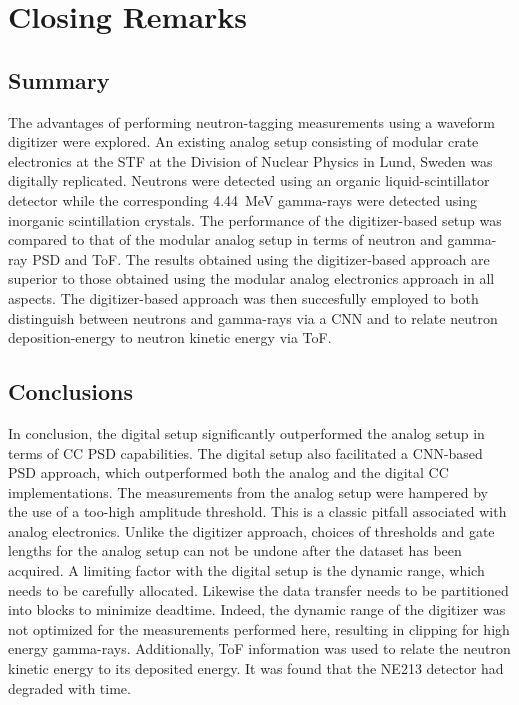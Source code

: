 \documentclass[main.tex]{subfiles}
\begin{document}
\chapter{Closing Remarks}
\section{Summary}
The advantages of performing neutron-tagging measurements using a waveform digitizer were explored. An existing analog setup consisting of modular crate electronics at the STF at the Division of Nuclear Physics  in Lund, Sweden was digitally replicated. Neutrons were detected using an organic liquid-scintillator detector while the corresponding \SI{4.44}{MeV} gamma-rays were detected using inorganic scintillation crystals. The performance of the digitizer-based setup was compared to that of the modular analog setup in terms of neutron and gamma-ray PSD and ToF. The results obtained using the digitizer-based approach are superior to those obtained using the modular analog electronics approach in all aspects. The digitizer-based approach was then succesfully employed to both distinguish between neutrons and gamma-rays via a CNN and to relate neutron deposition-energy to neutron kinetic energy via ToF.

\section{Conclusions}
In conclusion, the digital setup significantly outperformed the analog setup in terms of CC PSD capabilities. 
The digital setup also facilitated a CNN-based PSD approach, which outperformed both the analog and the digital CC implementations.
The measurements from the analog setup were hampered by the use of a too-high amplitude threshold. This is a classic pitfall associated with analog electronics. Unlike the digitizer approach, choices of thresholds and gate lengths for the analog setup can not be undone after the dataset has been acquired.
A limiting factor with the digital setup is the dynamic range, which needs to be carefully allocated. 
Likewise the data transfer needs to be partitioned into blocks to minimize deadtime. 
Indeed, the dynamic range of the digitizer was not optimized for the measurements performed here, resulting in clipping for high energy gamma-rays. 
Additionally, ToF information was used to relate the neutron kinetic energy to its deposited energy. It was found that the NE213 detector had degraded with time.
\end{document}
